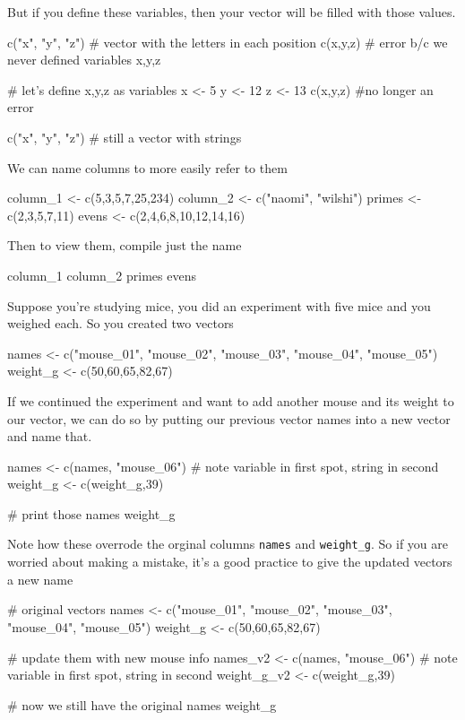 But if you define these variables, then your vector will be filled
with those values.

\begin{rcode}
  c("x", "y", "z") # vector with the letters in each position
  c(x,y,z) # error b/c we never defined variables x,y,z

  # let's define x,y,z as variables 
  x <- 5 
  y <- 12 
  z <- 13 
  c(x,y,z) #no longer an error

    c("x", "y", "z") # still a vector with strings
  \end{rcode}
    
We can name columns to more easily refer to them

\begin{rcode}
  column_1 <- c(5,3,5,7,25,234)
  column_2 <- c("naomi", "wilshi")
  primes <- c(2,3,5,7,11)
  evens <- c(2,4,6,8,10,12,14,16)
\end{rcode}

Then to view them, compile just the name

\begin{rcode}
  column_1 
  column_2 
  primes 
  evens 
\end{rcode}

Suppose you're studying mice, you did an experiment with five mice and
you weighed each. So you created two vectors

\begin{rcode}
  names <- c("mouse_01", "mouse_02", "mouse_03", "mouse_04", "mouse_05")
  weight_g <- c(50,60,65,82,67)
\end{rcode}

If we continued the experiment and want to add another mouse and its
weight to our vector, we can do so by putting our previous vector
names into a new vector and name that.

\begin{rcode}
  names <- c(names, "mouse_06") # note variable in first spot, string in second
  weight_g <- c(weight_g,39)
  
  # print those
  names
  weight_g
\end{rcode} 

Note how these overrode the orginal columns \texttt{names} and \texttt{weight\_g}.  So if you are worried about making a mistake, it's a good practice to give the updated vectors a new name

\begin{rcode}
  # original vectors
  names <- c("mouse_01", "mouse_02", "mouse_03", "mouse_04", "mouse_05")
  weight_g <- c(50,60,65,82,67)
  
  # update them with new mouse info    
  names_v2 <- c(names, "mouse_06") # note variable in first spot, string in second
  weight_g_v2 <- c(weight_g,39)
  
  # now we still have the original
  names
  weight_g
\end{rcode} 

